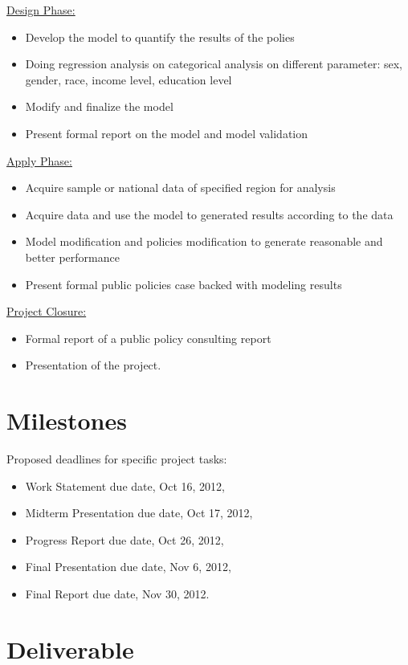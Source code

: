\documentclass[12pt,letterpaper]{article}
\theoremstyle{definition}
\begin{document}
\underline {Design Phase:}
\begin{itemize}
    \item Develop the model to quantify the results of the polies 
    \item Doing regression analysis on categorical analysis on different parameter: sex, gender, race, income level, education level
   \item Modify and finalize the model
    \item Present formal report on the model and model validation
\end{itemize}

\underline {Apply Phase:}
\begin{itemize}
    \item Acquire sample or national data of specified region for analysis
    \item Acquire data and use the model to generated results according to the data
    \item Model modification and policies modification to generate reasonable and better performance
    \item Present formal public policies case backed with modeling results
\end{itemize}

 
\underline {Project Closure:}
\begin{itemize}
    \item Formal report of a public policy consulting report
    \item Presentation of the project. 
\end{itemize}

 
\section{Milestones}
Proposed deadlines for specific project tasks:
\begin{itemize}
    \item Work Statement due date, Oct 16, 2012,
    \item Midterm Presentation due date, Oct 17, 2012,
    \item Progress Report due date, Oct 26, 2012,
    \item Final Presentation due date, Nov 6, 2012,
    \item Final Report due date, Nov 30, 2012.
\end{itemize}

\section{Deliverable}
\end{document}
